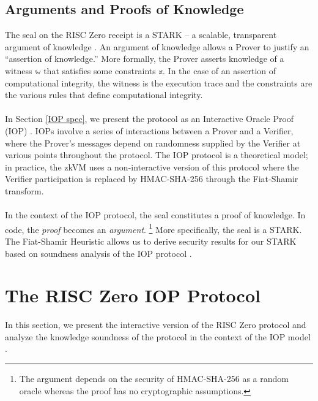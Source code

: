 \documentclass[10pt,letterpaper,titlepage]{article}
\theoremstyle{definition}
\begin{document}
\subsection{Arguments and Proofs of Knowledge}
\label{arguments}
The seal on the RISC Zero receipt is a STARK -- a scalable, transparent argument of knowledge \cite{stark}.
An argument of knowledge allows a Prover to justify an ``assertion of knowledge.''
More formally, the Prover asserts knowledge of a witness $\mathbb{w}$ that satisfies some constraints $\mathbb{x}$.
In the case of an assertion of computational integrity, the witness is the execution trace and the constraints are the various rules that define computational integrity. \\
\\
In Section \ref{IOP spec}, we present the protocol as an Interactive Oracle Proof (IOP) \cite{iop}.
IOPs involve a series of interactions between a Prover and a Verifier, where the Prover's messages depend on randomness supplied by the Verifier at various points throughout the protocol.
The IOP protocol is a theoretical model; in practice, the zkVM uses a non-interactive version of this protocol where the Verifier participation is replaced by HMAC-SHA-256 through the Fiat-Shamir transform.\\
\\
In the context of the IOP protocol, the seal constitutes a proof of knowledge. In code, the \textit{proof} becomes an \textit{argument}.%
\footnote{The argument depends on the security of HMAC-SHA-256 as a random oracle whereas the proof has no cryptographic assumptions.}
More specifically, the seal is a STARK.
The Fiat-Shamir Heuristic allows us to derive security results for our STARK based on soundness analysis of the IOP protocol \cite{fiat-shamir}.

\section{The RISC Zero IOP Protocol}
\label{iop}
In this section, we present the interactive version of the RISC Zero protocol and analyze the knowledge soundness of the protocol in the context of the IOP model \cite{iop}.
\end{document}
